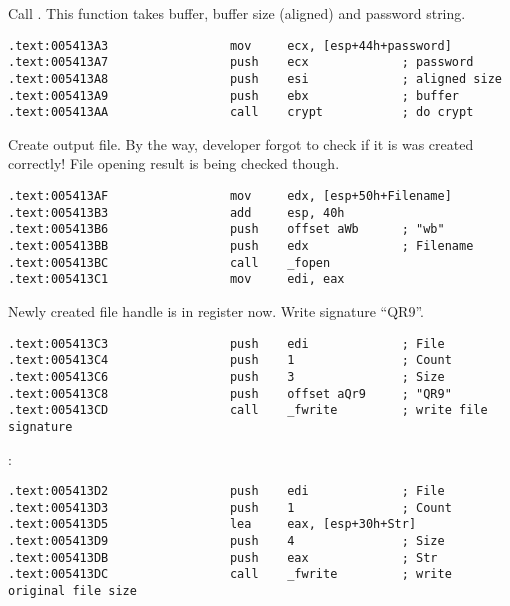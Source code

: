 {Call . This function takes buffer, buffer size (aligned) and password string.}

\begin{lstlisting}
.text:005413A3                 mov     ecx, [esp+44h+password]
.text:005413A7                 push    ecx             ; password
.text:005413A8                 push    esi             ; aligned size
.text:005413A9                 push    ebx             ; buffer
.text:005413AA                 call    crypt           ; do crypt
\end{lstlisting}

{Create output file. By the way, developer forgot to check if it is was created correctly! 
File opening result is being checked though.}

\begin{lstlisting}
.text:005413AF                 mov     edx, [esp+50h+Filename]
.text:005413B3                 add     esp, 40h
.text:005413B6                 push    offset aWb      ; "wb"
.text:005413BB                 push    edx             ; Filename
.text:005413BC                 call    _fopen
.text:005413C1                 mov     edi, eax
\end{lstlisting}

{Newly created file handle is in \EDI register now. Write signature ``QR9''.}

\begin{lstlisting}
.text:005413C3                 push    edi             ; File
.text:005413C4                 push    1               ; Count
.text:005413C6                 push    3               ; Size
.text:005413C8                 push    offset aQr9     ; "QR9"
.text:005413CD                 call    _fwrite         ; write file signature
\end{lstlisting}

:

\begin{lstlisting}
.text:005413D2                 push    edi             ; File
.text:005413D3                 push    1               ; Count
.text:005413D5                 lea     eax, [esp+30h+Str]
.text:005413D9                 push    4               ; Size
.text:005413DB                 push    eax             ; Str
.text:005413DC                 call    _fwrite         ; write original file size
\end{lstlisting}

